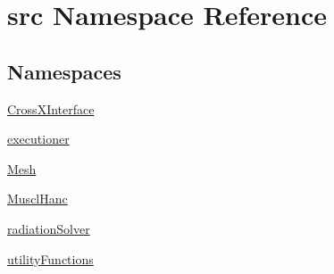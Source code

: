 \hypertarget{namespacesrc}{\section{src Namespace Reference}
\label{namespacesrc}
}
\subsection*{Namespaces}
\begin{DoxyCompactItemize}
\item 
\hyperlink{namespacesrc_1_1_cross_x_interface}{Cross\-X\-Interface}
\item 
\hyperlink{namespacesrc_1_1executioner}{executioner}
\item 
\hyperlink{namespacesrc_1_1_mesh}{Mesh}
\item 
\hyperlink{namespacesrc_1_1_muscl_hanc}{Muscl\-Hanc}
\item 
\hyperlink{namespacesrc_1_1radiation_solver}{radiation\-Solver}
\item 
\hyperlink{namespacesrc_1_1utility_functions}{utility\-Functions}
\end{DoxyCompactItemize}

